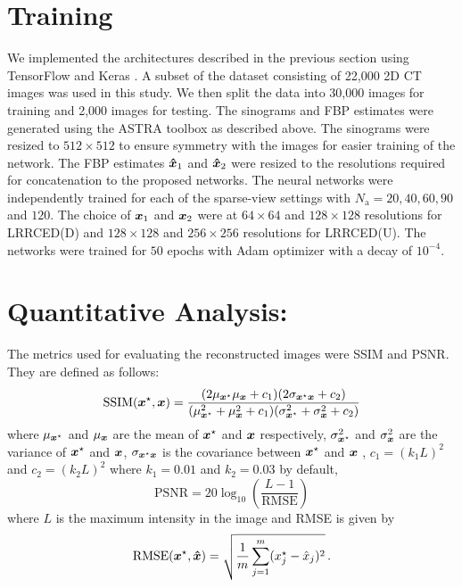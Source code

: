 \section{Training}

We implemented the architectures described in the previous section using TensorFlow and Keras \cite{abadi2016tensorflow,chollet2015keras}. A subset of the dataset consisting of 22,000 \ac{2D} \ac{CT} images was used in this study. We then split the data into 30,000 images for training and 2,000 images for testing. The sinograms and \ac{FBP} estimates were generated using the ASTRA toolbox as described above. The sinograms were resized to $512 \times 512$ to ensure symmetry with the images for easier training of the network. The \ac{FBP} estimates $\bm{\hat{x}}_1$ and $\bm{\hat{x}}_2$ were resized to the resolutions required for concatenation to the proposed networks. The neural networks were independently trained for each of the sparse-view settings with $N_\mathrm{a}=20,40,60,90$ and $120$. The choice of $\bm{x}_1$ and $\bm{x}_2$ were at $64\times64$ and $128\times128$ resolutions for \ac{LRRCED}(D) and $128\times128$ and $256\times256$ resolutions for \ac{LRRCED}(U). The networks were trained for $50$ epochs with Adam optimizer with a decay of $10^{-4}$.


\section{Quantitative Analysis:}

The metrics used for evaluating the reconstructed images were \ac{SSIM} and \ac{PSNR}. They are defined as follows:
\begin{equation}
\mathrm{SSIM}(\bm{x}^\star,\bm{x}) = \frac{(2\mu_{\bm{x}^\star}\mu_{\bm{x}}+c_{1})(2\sigma_{\bm{x}^\star\bm{x}}+c_{2})}{(\mu_{\bm{x}^\star}^2+\mu_{\bm{x}}^2+c_{1})(\sigma_{\bm{x}^\star}^2+\sigma_{\bm{x}}^2+c_{2})}   
\end{equation}
where $\mu_{\bm{x}^\star}$ and $\mu_{\bm{x}}$ are the mean of $\bm{x}^\star$ and $\bm{x}$ respectively, $\sigma_{\bm{x}^\star}^2$ and $\sigma_{\bm{x}}^2$ are the variance of $\bm{x}^\star$ and $\bm{x}$, $\sigma_{\bm{x}^\star\bm{x}}$ is the covariance between $\bm{x}^\star$ and $\bm{x}$ , $c_{1}=(k_{1}L)^2$ and $c_{2}=(k_{2}L)^2$ where $k_{1}=0.01$ and $k_{2}=0.03$ by default,
\begin{equation}
\mathrm{PSNR} = 20\log_{10}\left(\frac{L-1}{\mathrm{RMSE}}\right)
\end{equation}
where $L$ is the maximum intensity in the image and \ac{RMSE} is given by
\begin{equation}
\mathrm{RMSE}(\bm{x}^\star,\bm{\hat{x}}) = \sqrt{\frac{1}{m}   \sum_{j=1}^{m} (x^\star_j-\hat{x}_j )^2} \, .
\end{equation}



